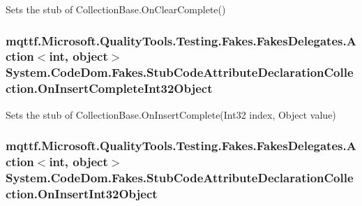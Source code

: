 Sets the stub of Collection\-Base.\-On\-Clear\-Complete()

\hypertarget{class_system_1_1_code_dom_1_1_fakes_1_1_stub_code_attribute_declaration_collection_a52c82ef41efc7964b2ad78ad9bea9a68}{
\subsubsection[{On\-Insert\-Complete\-Int32\-Object}]{\setlength{\rightskip}{0pt plus 5cm}mqttf.\-Microsoft.\-Quality\-Tools.\-Testing.\-Fakes.\-Fakes\-Delegates.\-Action$<$int, object$>$ System.\-Code\-Dom.\-Fakes.\-Stub\-Code\-Attribute\-Declaration\-Collection.\-On\-Insert\-Complete\-Int32\-Object}}\label{class_system_1_1_code_dom_1_1_fakes_1_1_stub_code_attribute_declaration_collection_a52c82ef41efc7964b2ad78ad9bea9a68}


Sets the stub of Collection\-Base.\-On\-Insert\-Complete(\-Int32 index, Object value)

\hypertarget{class_system_1_1_code_dom_1_1_fakes_1_1_stub_code_attribute_declaration_collection_a2056ea2b49c2d3bc597483f281d75248}{
\subsubsection[{On\-Insert\-Int32\-Object}]{\setlength{\rightskip}{0pt plus 5cm}mqttf.\-Microsoft.\-Quality\-Tools.\-Testing.\-Fakes.\-Fakes\-Delegates.\-Action$<$int, object$>$ System.\-Code\-Dom.\-Fakes.\-Stub\-Code\-Attribute\-Declaration\-Collection.\-On\-Insert\-Int32\-Object}}\label{class_system_1_1_code_dom_1_1_fakes_1_1_stub_code_attribute_declaration_collection_a2056ea2b49c2d3bc597483f281d75248}


